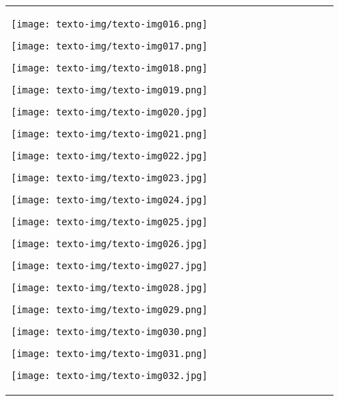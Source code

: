 \documentclass{article}
\begin{document}
\begin{flushleft}
\begin{supertabular}{m{7.7320004cm}m{0.091000006cm}|m{2.421cm}|m{0.089cm}m{0.694cm}m{0.693cm}m{0.693cm}m{0.693cm}m{0.693cm}m{0.691cm}m{0.693cm}m{0.703cm}}
\begin{center}
\end{center}
\begin{center}
\texttt{[image: texto-img/texto-img016.png]}
\end{center}
\begin{center}
\texttt{[image: texto-img/texto-img017.png]}
\end{center}
\begin{center}
\texttt{[image: texto-img/texto-img018.png]}
\end{center}
\begin{center}
\texttt{[image: texto-img/texto-img019.png]}
\end{center}
\begin{center}
\texttt{[image: texto-img/texto-img020.jpg]}
\end{center}
\begin{center}
\texttt{[image: texto-img/texto-img021.png]}
\end{center}
\begin{center}
\texttt{[image: texto-img/texto-img022.jpg]}
\end{center}
\begin{center}
\texttt{[image: texto-img/texto-img023.jpg]}
\end{center}
\begin{center}
\texttt{[image: texto-img/texto-img024.jpg]}
\end{center}
\begin{center}
\texttt{[image: texto-img/texto-img025.jpg]}
\end{center}
\begin{center}
\texttt{[image: texto-img/texto-img026.jpg]}
\end{center}
\begin{center}
\texttt{[image: texto-img/texto-img027.jpg]}
\end{center}
\begin{center}
\texttt{[image: texto-img/texto-img028.jpg]}
\end{center}
\begin{center}
\texttt{[image: texto-img/texto-img029.png]}
\end{center}
\begin{center}
\texttt{[image: texto-img/texto-img030.png]}
\end{center}
\begin{center}
\texttt{[image: texto-img/texto-img031.png]}
\end{center}
\begin{center}
\texttt{[image: texto-img/texto-img032.jpg]}

\end{center}
\end{supertabular}
\end{flushleft}
\end{document}
